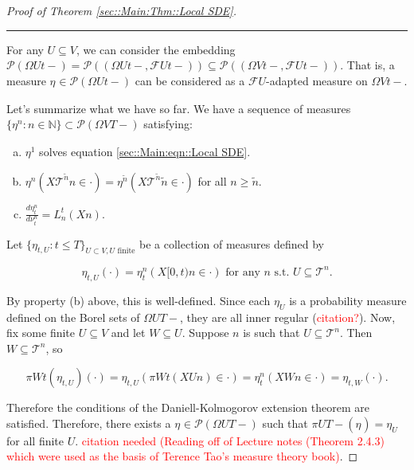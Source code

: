 \documentclass[12pt]{article}
\newcommand{\mb}{\mathbb}
\newcommand{\mc}{\mathcal}
\newcommand{\ms}{\mathscr}
\newcommand{\te}{\text}
\newcommand{\tr}{\textcolor{red}}
\newcommand{\ind}{\hspace{24pt}}
\newcommand{\lin}{\rule{\linewidth}{0.4 pt}}
\newcommand{\pmsr}{\mc{P}}							%
\renewcommand{\U}{U}							%
\newcommand{\UU}{W}								%
\newcommand{\T}{T}								%
\renewcommand{\t}{t}							%
\newcommand{\proj}{\pi}							%
\newcommand{\F}{\mc{F}}							%
\newcommand{\X}{X}								%
\newcommand{\pup}[1]{^{#1}}							%
\newcommand{\tree}{\mc{T}}							%
\newcommand{\numb}{n}								%
\newcommand{\mm}[3]{\nu_{#2#1}^{#3}}						%
\newcommand{\mmm}[3]{\eta_{#2#1}^{#3}}						%
\newcommand{\alt}{\widetilde}						%
\newcommand{\dense}[2]{L_{#1}^{#2}}				%
\begin{document}
\begin{proof}[Proof of Theorem \ref{sec::Main:Thm::Local SDE}]
\lin

For any \(\U\subseteq  V\), we can consider the embedding \(\pmsr\left(\Omega{\U}{\t-}\right) = \pmsr\left((\Omega{\U}{\t-},\F{\U}{\t-})\right) \subseteq \pmsr\left((\Omega{ V}{\t-},\F{\U}{\t-})\right)\). That is, a measure \(\mmm{}{}{}\in \pmsr\left(\Omega{\U}{\t-}\right)\) can be considered as a \(\F{\U}{}\)-adapted measure on \(\Omega{ V}{\t-}\).

\ind Let's summarize what we have so far. We have a sequence of measures \(\{\mmm{}{}{\numb}:\numb\in\mb{N}\} \subset \pmsr(\Omega{ V}{\T-})\) satisfying:

\begin{enumerate}[(a)]
\item \(\mmm{}{}{1}\) solves equation \eqref{sec::Main:eqn::Local SDE}.

\item \(\mmm{}{}{\numb}(\X{\tree\pup{\alt{\numb}}}{}{\numb} \in \cdot) = \mmm{}{}{\alt{\numb}}(\X{\tree\pup{\alt{\numb}}}{}{\alt{\numb}}\in \cdot)\) for all \(\numb \geq \alt{\numb}\).

\item \(\frac{d\mmm{}{\t}{\numb}}{d\mm{}{\t}{\numb}} = \dense{\numb}{\t}(\X{}{}{\numb})\).
\end{enumerate}

Let \(\{\mmm{\U}{\t,}{}:\t \leq \T\}_{\U\subset  V,\U\te{ finite}}\) be a collection of measures defined by

\[\mmm{\U}{\t,}{}(\cdot) = \mmm{}{\t}{\numb}(\X{}{[0,\t)}{\numb} \in \cdot) \te{ for any }\numb\te{ s.t. }\U \subseteq \tree\pup{\numb}.\]

By property (b) above, this is well-defined. Since each \(\mmm{\U}{}{}\) is a probability measure defined on the Borel sets of \(\Omega{\U}{\T-}\), they are all inner regular (\tr{citation?}). Now, fix some finite \(\U\subseteq  V\) and let \(\UU \subseteq \U\). Suppose \(\numb\) is such that \(\U \subseteq \tree\pup{\numb}\). Then \(\UU\subseteq \tree\pup{\numb}\), so

\[\proj{\UU}{\t}(\mmm{\U}{\t,}{})(\cdot) = \mmm{\U}{\t,}{}\left(\proj{\UU}{\t}(\X{\U}{}{\numb}) \in \cdot\right) = \mmm{}{\t}{\numb}\left(\X{\UU}{}{\numb} \in \cdot\right) = \mmm{\UU}{\t,}{}(\cdot).\]

Therefore the conditions of the Daniell-Kolmogorov extension theorem are satisfied. Therefore, there exists a \(\mmm{}{}{}\in \ms{P}(\Omega{\U}{\T-})\) such that \(\proj{\U}{\T-}(\mmm{}{}{}) =\mmm{\U}{}{}\) for all finite \(\U\). \tr{citation needed (Reading off of Lecture notes (Theorem 2.4.3) which were used as the basis of Terence Tao's measure theory book)}.


\end{proof}
\end{document}
